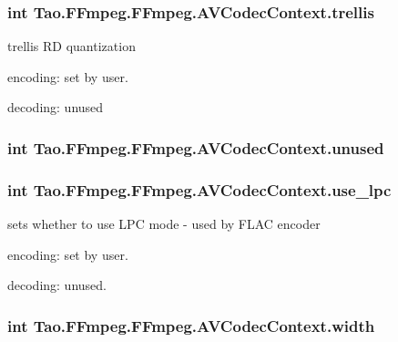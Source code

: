 \hypertarget{struct_tao_1_1_f_fmpeg_1_1_f_fmpeg_1_1_a_v_codec_context_ad72026ef8c4a07408af96baaf6eef7df}{
\subsubsection[{trellis}]{\setlength{\rightskip}{0pt plus 5cm}int {\bf Tao.FFmpeg.FFmpeg.AVCodecContext.trellis}}}
\label{struct_tao_1_1_f_fmpeg_1_1_f_fmpeg_1_1_a_v_codec_context_ad72026ef8c4a07408af96baaf6eef7df}
trellis RD quantization
\begin{DoxyItemize}
\item encoding: set by user.
\item decoding: unused 
\end{DoxyItemize}\hypertarget{struct_tao_1_1_f_fmpeg_1_1_f_fmpeg_1_1_a_v_codec_context_a68796abd8c0dd3eb4036b1f91dccd39a}{
\subsubsection[{unused}]{\setlength{\rightskip}{0pt plus 5cm}int {\bf Tao.FFmpeg.FFmpeg.AVCodecContext.unused}}}
\label{struct_tao_1_1_f_fmpeg_1_1_f_fmpeg_1_1_a_v_codec_context_a68796abd8c0dd3eb4036b1f91dccd39a}
\hypertarget{struct_tao_1_1_f_fmpeg_1_1_f_fmpeg_1_1_a_v_codec_context_a086438e6661e3c24c1b74f865861394e}{
\subsubsection[{use\_\-lpc}]{\setlength{\rightskip}{0pt plus 5cm}int {\bf Tao.FFmpeg.FFmpeg.AVCodecContext.use\_\-lpc}}}
\label{struct_tao_1_1_f_fmpeg_1_1_f_fmpeg_1_1_a_v_codec_context_a086438e6661e3c24c1b74f865861394e}
sets whether to use LPC mode -\/ used by FLAC encoder
\begin{DoxyItemize}
\item encoding: set by user.
\item decoding: unused. 
\end{DoxyItemize}\hypertarget{struct_tao_1_1_f_fmpeg_1_1_f_fmpeg_1_1_a_v_codec_context_a64a5f01f15cc28df8b34f00e5da8e993}{
\subsubsection[{width}]{\setlength{\rightskip}{0pt plus 5cm}int {\bf Tao.FFmpeg.FFmpeg.AVCodecContext.width}}}
